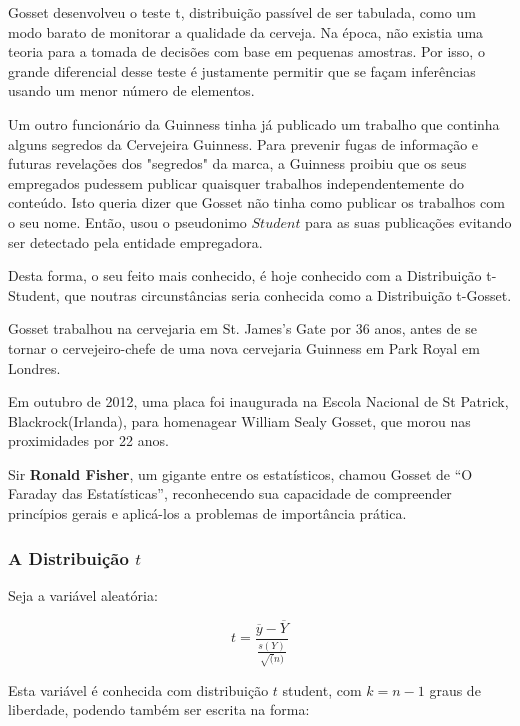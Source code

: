 Gosset desenvolveu o teste t, distribuição passível de ser tabulada, como um modo barato de monitorar a qualidade da cerveja. Na época, não existia uma teoria para a tomada de decisões com base em pequenas amostras. Por isso, o grande diferencial desse teste é justamente permitir que se façam inferências usando um menor número de elementos. \vskip0.3cm

Um outro funcionário da Guinness tinha já publicado um trabalho que continha alguns segredos da Cervejeira Guinness. Para prevenir fugas de informação e futuras revelações dos "segredos" da marca, a Guinness proibiu que os seus empregados pudessem publicar quaisquer trabalhos independentemente do conteúdo. Isto queria dizer que Gosset não tinha como publicar os trabalhos com o seu nome. Então, usou o pseudonimo $Student$ para as suas publicações evitando ser detectado pela entidade empregadora. \vskip0.3cm

\newpage
Desta forma, o seu feito mais conhecido, é hoje conhecido com a Distribuição t-Student, que noutras circunstâncias seria conhecida como a Distribuição t-Gosset.\vskip0.3cm


Gosset trabalhou na cervejaria em St. James's Gate por 36 anos, antes de se tornar o cervejeiro-chefe de uma nova cervejaria Guinness em Park Royal em Londres.\vskip0.3cm

Em outubro de 2012, uma placa foi inaugurada na Escola Nacional de St Patrick, Blackrock(Irlanda), para homenagear William Sealy Gosset, que morou nas proximidades por 22 anos. \vskip0.3cm

Sir \textbf{Ronald Fisher}, um gigante entre os estatísticos, chamou Gosset de “O Faraday das Estatísticas”, reconhecendo sua capacidade de compreender princípios gerais e aplicá-los a problemas de importância prática.



\subsubsection{A Distribuição $t$ }

Seja a variável aleatória:

\begin{equation}
    t =\frac{\overline{y}-\overline{Y}}{\frac{s(Y)}{\sqrt(n)}}
\end{equation}

Esta variável é conhecida com distribuição $t$ student, com $k=n-1$ graus de liberdade, podendo também ser escrita na forma:

